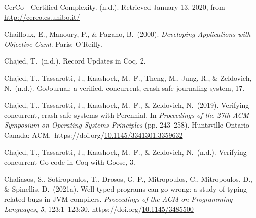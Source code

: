 \documentclass[12pt,twoside]{article}
\begin{document}
{\begin{thebibliography}{1079}
\mdbibitemlabel{}CerCo - Certified Complexity. (n.d.). Retrieved January 13, 2020, from \href{http://cerco.cs.unibo.it/}{{\ttfamily http://\hspace{0pt}cerco.\hspace{0pt}cs.\hspace{0pt}unibo.\hspace{0pt}it/\hspace{0pt}}}%

\mdbibitemlabel{}Chailloux, E., Manoury, P., \& Pagano, B.~(2000). \emph{Developing Applications with Objective Caml}. Paris: O’Reilly.%

\mdbibitemlabel{}Chajed, T.~(n.d.). Record Updates in Coq, 2.%

\mdbibitemlabel{}Chajed, T., Tassarotti, J., Kaashoek, M.~F., Theng, M., Jung, R., \& Zeldovich, N.~(n.d.). GoJournal: a verified, concurrent, crash-safe journaling system, 17.%

\mdbibitemlabel{}Chajed, T., Tassarotti, J., Kaashoek, M.~F., \& Zeldovich, N.~(2019). Verifying concurrent, crash-safe systems with Perennial. In \emph{Proceedings of the 27th ACM Symposium on Operating Systems Principles} (pp. 243–258). Huntsville Ontario Canada: ACM.~https://doi.org/\href{https://dx.doi.org/10.1145/3341301.3359632}{10.1145/3341301.3359632}%

\mdbibitemlabel{}Chajed, T., Tassarotti, J., Kaashoek, M.~F., \& Zeldovich, N.~(n.d.). Verifying concurrent Go code in Coq with Goose, 3.%

\mdbibitemlabel{}Chaliasos, S., Sotiropoulos, T., Drosos, G.-P., Mitropoulos, C., Mitropoulos, D., \& Spinellis, D.~(2021a). Well-typed programs can go wrong: a study of typing-related bugs in JVM compilers. \emph{Proceedings of the ACM on Programming Languages}, \emph{5}, 123:1–123:30. https://doi.org/\href{https://dx.doi.org/10.1145/3485500}{10.1145/3485500}%


\end{thebibliography}}
\end{document}
